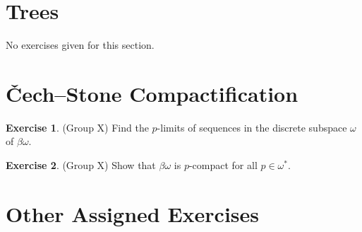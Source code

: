 \documentclass{article}
\theoremstyle{definition}
\newtheorem{exercise}{Exercise}[section]
\begin{document}
\section{Trees}
No exercises given for this section.

\section{Čech–Stone Compactiﬁcation}
    \begin{exercise}
        (Group X) Find the \( p \)-limits of sequences in the discrete subspace \(\omega\) of \(\beta\omega\).
    \end{exercise}
    
    \begin{exercise}
        (Group X) Show that \(\beta\omega\) is \( p \)-compact for all \( p \in \omega^* \).
    \end{exercise}
\section{Other Assigned Exercises}
\end{document}
